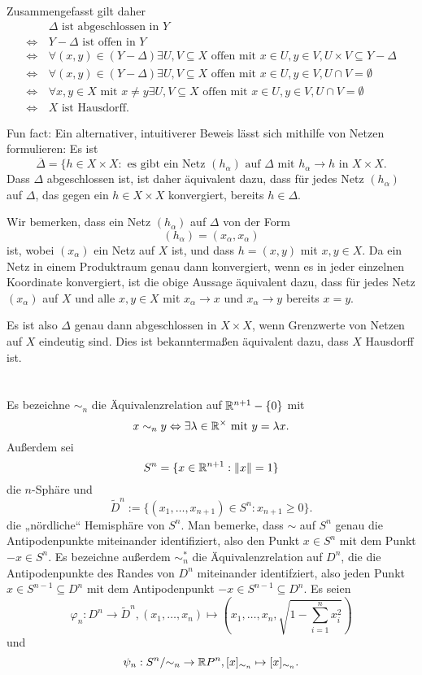 \documentclass[a4paper,10pt]{article}
\begin{document}
Zusammengefasst gilt daher
\begin{align*}
                &\, \Delta \text{ ist abgeschlossen in } Y \\
 \Leftrightarrow&\, Y-\Delta \text{ ist offen in } Y \\
 \Leftrightarrow&\, \forall (x,y) \in (Y-\Delta) \exists U,V \subseteq X \text{ offen mit } x \in U, y \in V, U \times V \subseteq Y-\Delta \\
 \Leftrightarrow&\, \forall (x,y) \in (Y-\Delta) \exists U,V \subseteq X \text{ offen mit } x \in U, y \in V, U \cap V = \emptyset \\
 \Leftrightarrow&\, \forall x,y \in X \text{ mit } x \neq y \exists U,V \subseteq X \text{ offen mit } x \in U, y \in V, U \cap V = \emptyset \\
 \Leftrightarrow&\, X \text{ ist Hausdorff.}
\end{align*}

Fun fact: Ein alternativer, intuitiverer Beweis lässt sich mithilfe von Netzen formulieren: Es ist
\[
 \overline{\Delta} = \{h \in X \times X : \text{ es gibt ein Netz $(h_\alpha)$ auf $\Delta$ mit $h_\alpha \to h$ in $X \times X$}.
\]
Dass $\Delta$ abgeschlossen ist, ist daher äquivalent dazu, dass für jedes Netz $(h_\alpha)$ auf $\Delta$, das gegen ein $h \in X \times X$ konvergiert, bereits $h \in \Delta$.

Wir bemerken, dass ein Netz $(h_\alpha)$ auf $\Delta$ von der Form
\[
 (h_\alpha) = (x_\alpha, x_\alpha)
\]
ist, wobei $(x_\alpha)$ ein Netz auf $X$ ist, und dass $h = (x,y)$ mit $x,y \in X$. Da ein Netz in einem Produktraum genau dann konvergiert, wenn es in jeder einzelnen Koordinate konvergiert, ist die obige Aussage äquivalent dazu, dass für jedes Netz $(x_\alpha)$ auf $X$ und alle $x,y \in X$ mit $x_\alpha \to x$ und $x_\alpha \to y$ bereits $x = y$.

Es ist also $\Delta$ genau dann abgeschlossen in $X \times X$, wenn Grenzwerte von Netzen auf $X$ eindeutig sind. Dies ist bekanntermaßen äquivalent dazu, dass $X$ Hausdorff ist.





\section{}
Es bezeichne $\sim_n$ die Äquivalenzrelation auf $\mathbb{R}^{n+1} - \{0\}$ mit
\[
 x \sim_n y \Leftrightarrow \exists \lambda \in \mathbb{R}^\times \text{ mit } y = \lambda x.
\]
Außerdem sei
\[
 S^n = \{x \in \mathbb{R}^{n+1} : \|x\|=1\}
\]
die $n$-Sphäre und
\[
 \tilde{D}^n := \{(x_1, \ldots, x_{n+1}) \in S^n : x_{n+1} \geq 0\}.
\]
die „nördliche“ Hemisphäre von $S^n$. Man bemerke, dass $\sim$ auf $S^n$ genau die Antipodenpunkte miteinander identifiziert, also den Punkt $x \in S^n$ mit dem Punkt $-x \in S^n$.
Es bezeichne außerdem $\sim^*_n$ die Äquivalenzrelation auf $D^n$, die die Antipodenpunkte des Randes von $D^n$ miteinander identifziert, also jeden Punkt $x \in S^{n-1} \subseteq D^n$ mit dem Antipodenpunkt $-x \in S^{n-1} \subseteq D^n$. Es seien
\[
 \varphi_n : D^n \to \tilde{D}^n, (x_1, \ldots, x_n) \mapsto \left(x_1, \ldots, x_n, \sqrt{1-\sum_{i=1}^n x_i^2}\right)
\]
und
\[
 \psi_n : S^n/{\sim_n} \to \mathbb{R} P^n, [x]_{\sim_n} \mapsto [x]_{\sim_n}.
\]
\end{document}
